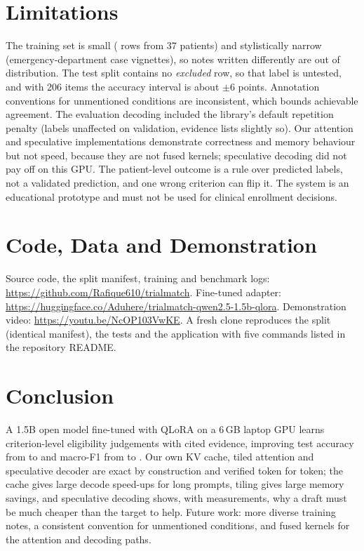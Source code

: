 \documentclass[conference]{IEEEtran}
\newcommand{\VideoURL}{\url{https://youtu.be/NcOP103VwKE}}
\begin{document}
\section{Limitations}
The training set is small (\TrainRows{} rows from 37 patients) and stylistically narrow (emergency-department case vignettes), so notes written differently are out of distribution. The test split contains no \emph{excluded} row, so that label is untested, and with 206 items the accuracy interval is about $\pm$6 points. Annotation conventions for unmentioned conditions are inconsistent, which bounds achievable agreement. The evaluation decoding included the library's default repetition penalty (labels unaffected on validation, evidence lists slightly so). Our attention and speculative implementations demonstrate correctness and memory behaviour but not speed, because they are not fused kernels; speculative decoding did not pay off on this GPU. The patient-level outcome is a rule over predicted labels, not a validated prediction, and one wrong criterion can flip it. The system is an educational prototype and must not be used for clinical enrollment decisions.

\section{Code, Data and Demonstration}
Source code, the split manifest, training and benchmark logs: \url{https://github.com/Rafique610/trialmatch}. Fine-tuned adapter: \url{https://huggingface.co/Aduhere/trialmatch-qwen2.5-1.5b-qlora}. Demonstration video: \VideoURL. A fresh clone reproduces the split (identical manifest), the tests and the application with five commands listed in the repository README.

\section{Conclusion}
A 1.5B open model fine-tuned with QLoRA on a 6\,GB laptop GPU learns criterion-level eligibility judgements with cited evidence, improving test accuracy from \TestAccBase{} to \TestAccFT{} and macro-F1 from \TestFoneBase{} to \TestFoneFT{}. Our own KV cache, tiled attention and speculative decoder are exact by construction and verified token for token; the cache gives large decode speed-ups for long prompts, tiling gives large memory savings, and speculative decoding shows, with measurements, why a draft must be much cheaper than the target to help. Future work: more diverse training notes, a consistent convention for unmentioned conditions, and fused kernels for the attention and decoding paths.
\end{document}
